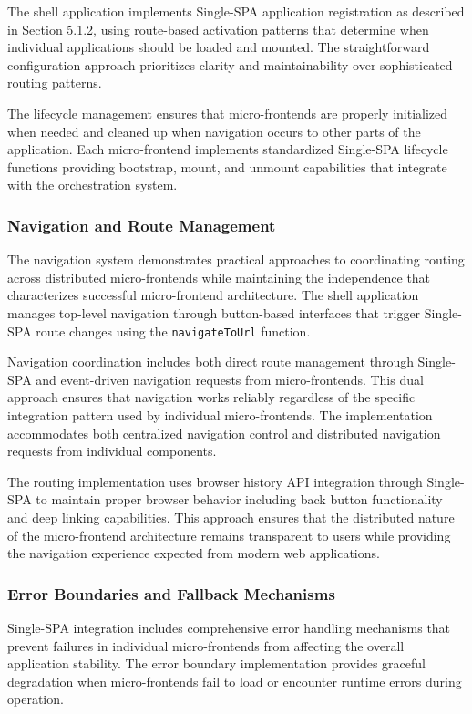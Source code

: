\documentclass[12pt,a4paper]{report}
\begin{document}
The shell application implements Single-SPA application registration as described in Section 5.1.2, using route-based activation patterns that determine when individual applications should be loaded and mounted. The straightforward configuration approach prioritizes clarity and maintainability over sophisticated routing patterns.

The lifecycle management ensures that micro-frontends are properly initialized when needed and cleaned up when navigation occurs to other parts of the application. Each micro-frontend implements standardized Single-SPA lifecycle functions providing bootstrap, mount, and unmount capabilities that integrate with the orchestration system.

\subsubsection{Navigation and Route Management}

The navigation system demonstrates practical approaches to coordinating routing across distributed micro-frontends while maintaining the independence that characterizes successful micro-frontend architecture. The shell application manages top-level navigation through button-based interfaces that trigger Single-SPA route changes using the \texttt{navigateToUrl} function.

Navigation coordination includes both direct route management through Single-SPA and event-driven navigation requests from micro-frontends. This dual approach ensures that navigation works reliably regardless of the specific integration pattern used by individual micro-frontends. The implementation accommodates both centralized navigation control and distributed navigation requests from individual components.

The routing implementation uses browser history API integration through Single-SPA to maintain proper browser behavior including back button functionality and deep linking capabilities. This approach ensures that the distributed nature of the micro-frontend architecture remains transparent to users while providing the navigation experience expected from modern web applications.

\subsubsection{Error Boundaries and Fallback Mechanisms}

Single-SPA integration includes comprehensive error handling mechanisms that prevent failures in individual micro-frontends from affecting the overall application stability. The error boundary implementation provides graceful degradation when micro-frontends fail to load or encounter runtime errors during operation.
\end{document}
